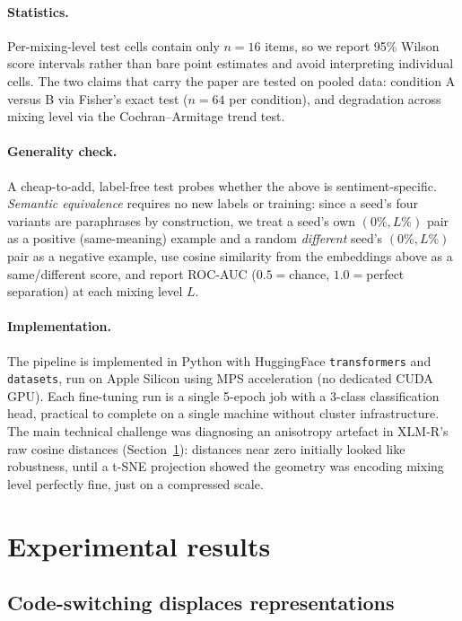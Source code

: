 \documentclass{article}
\begin{document}
\paragraph{Statistics.} Per-mixing-level test cells contain only $n=16$ items,
so we report 95\% Wilson score intervals rather than bare point estimates and
avoid interpreting individual cells. The two claims that carry the paper are
tested on pooled data: condition A versus B via Fisher's exact test
($n=64$ per condition), and degradation across mixing level via the
Cochran--Armitage trend test.

\paragraph{Generality check.} A cheap-to-add, label-free test probes whether
the above is sentiment-specific. \emph{Semantic equivalence} requires no new
labels or training: since a seed's four variants are paraphrases by
construction, we treat a seed's own $(0\%, L\%)$ pair as a positive
(same-meaning) example and a random \emph{different} seed's $(0\%, L\%)$ pair
as a negative example, use cosine similarity from the embeddings above as a
same/different score, and report ROC-AUC ($0.5{=}$chance,
$1.0{=}$perfect separation) at each mixing level $L$.

\paragraph{Implementation.} The pipeline is implemented in Python with
HuggingFace \texttt{transformers} and \texttt{datasets}, run on Apple Silicon
using MPS acceleration (no dedicated CUDA GPU). Each fine-tuning run is a
single 5-epoch job with a 3-class classification head, practical to complete
on a single machine without cluster infrastructure. The main technical
challenge was diagnosing an anisotropy artefact in XLM-R's raw cosine
distances (Section~\ref{sec:results}): distances near zero initially looked
like robustness, until a t-SNE projection showed the geometry was encoding
mixing level perfectly fine, just on a compressed scale.

\section{Experimental results}
\label{sec:results}

\subsection{Code-switching displaces representations}
\label{sec:drift-section}
\end{document}
